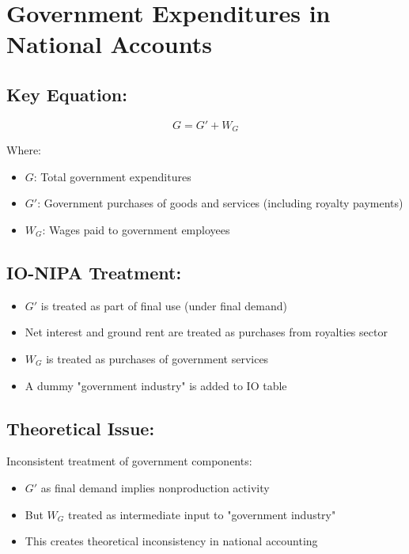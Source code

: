 
\section*{Government Expenditures in National Accounts}

\subsection*{Key Equation:}
\[
G = G' + W_G
\]

Where:
\begin{itemize}
    \item $G$: Total government expenditures
    \item $G'$: Government purchases of goods and services (including royalty payments)
    \item $W_G$: Wages paid to government employees
\end{itemize}

\subsection*{IO-NIPA Treatment:}
\begin{itemize}
    \item $G'$ is treated as part of final use (under final demand)
    \item Net interest and ground rent are treated as purchases from royalties sector
    \item $W_G$ is treated as purchases of government services
    \item A dummy "government industry" is added to IO table
\end{itemize}

\subsection*{Theoretical Issue:}
Inconsistent treatment of government components:
\begin{itemize}
    \item $G'$ as final demand implies nonproduction activity
    \item But $W_G$ treated as intermediate input to "government industry"
    \item This creates theoretical inconsistency in national accounting
\end{itemize}